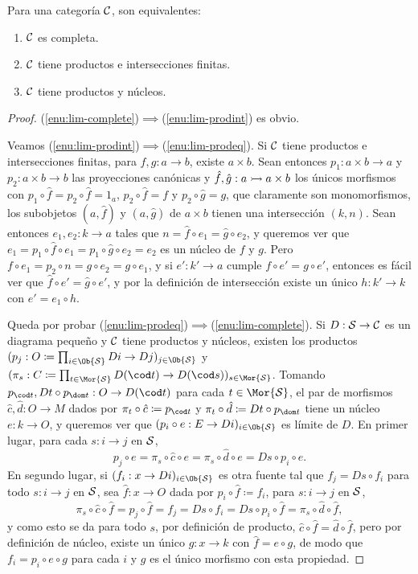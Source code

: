 \begin{theorem}
  Para una categoría $\mathcal{C}$, son equivalentes:
  \begin{enumerate}
  \item \label{enu:lim-complete} $\mathcal{C}$ es completa.
  \item \label{enu:lim-prodint} $\mathcal{C}$ tiene productos e intersecciones finitas.
  \item \label{enu:lim-prodeq} $\mathcal{C}$ tiene productos y núcleos.
  \end{enumerate}
\end{theorem}
\begin{proof}
  (\ref{enu:lim-complete})$\implies$(\ref{enu:lim-prodint}) es obvio.

  Veamos (\ref{enu:lim-prodint})$\implies$(\ref{enu:lim-prodeq}). Si $\mathcal{C}$ tiene
  productos e intersecciones finitas, para $f,g:a\to b$, existe $a\times
  b$. Sean entonces $p_1:a\times b\to a$ y $p_2:a\times b\to b$ las proyecciones
  canónicas y $\hat f,\hat g:a\rightarrowtail a\times b$ los únicos morfismos con
  $p_1\circ\hat f=p_2\circ\hat f=1_a$, $p_2\circ\hat f=f$ y $p_2\circ\hat g=g$,
  que claramente son monomorfismos, los subobjetos $(a,\hat f)$ y $(a,\hat g)$
  de $a\times b$ tienen una intersección $(k,n)$. Sean entonces $e_1,e_2:k\to a$
  tales que $n=\hat f\circ e_1=\hat g\circ e_2$, y queremos ver que
  $e_1=p_1\circ\hat f\circ e_1=p_1\circ\hat g\circ e_2=e_2$ es un núcleo de $f$
  y $g$. Pero $f\circ e_1=p_2\circ n=g\circ e_2=g\circ e_1$, y si $e':k'\to a$
  cumple $f\circ e'=g\circ e'$, entonces es fácil ver que
  $\hat f\circ e'=\hat g\circ e'$, y por la definición de intersección existe
  un único $h:k'\to k$ con $e'=e_1\circ h$.

  Queda por probar (\ref{enu:lim-prodeq})$\implies$(\ref{enu:lim-complete}). Si
  $D:\mathcal{S}\to\mathcal{C}$ es un diagrama pequeño y $\mathcal{C}$ tiene productos y núcleos,
  existen los productos
  $(p_j:O\coloneqq\prod_{i\in\Ob{\cS}}Di\to Dj)_{j\in\Ob{\cS}}$ y
  $(\pi_s:C\coloneqq\prod_{t\in\Mor{\cS}}D(\cod t)\to D(\cod
  s))_{s\in\Mor{\cS}}$. Tomando $p_{\cod t},Dt\circ p_{\dom t}:O\to D(\cod t)$
  para cada $t\in\Mor{\cS}$, el par de morfismos $\hat c,\hat d:O\to M$ dados
  por $\pi_t\circ\hat c\coloneqq p_{\cod t}$ y
  $\pi_t\circ\hat d\coloneqq Dt\circ p_{\dom t}$ tiene un núcleo $e:k\to O$, y
  queremos ver que $(p_i\circ e:E\to Di)_{i\in\Ob{\cS}}$ es límite de $D$. En
  primer lugar, para cada $s:i\to j$ en $\mathcal{S}$,
  \[
    p_j\circ e=\pi_s\circ\hat c\circ e=\pi_s\circ\hat d\circ e=Ds\circ p_i\circ e.
  \]
  En segundo lugar, si $(f_i:x\to Di)_{i\in\Ob{\cS}}$ es otra fuente tal que
  $f_j=Ds\circ f_i$ para todo $s:i\to j$ en $\mathcal{S}$, sea $\hat f:x\to O$ dada por
  $p_i\circ\hat f\coloneqq f_i$, para $s:i\to j$ en $\mathcal{S}$,
  \[
    \pi_s\circ\hat c\circ\hat f=p_j\circ\hat f=f_j=Ds\circ f_i=Ds\circ
    p_i\circ\hat f=\pi_s\circ\hat d\circ\hat f,
  \]
  y como esto se da para todo $s$,
  por definición de producto, $\hat c\circ\hat f=\hat d\circ\hat f$, pero por
  definición de núcleo, existe un único $g:x\to k$ con $\hat f=e\circ g$, de
  modo que $f_i=p_i\circ e\circ g$ para cada $i$ y $g$ es el único morfismo con
  esta propiedad.
\end{proof}

